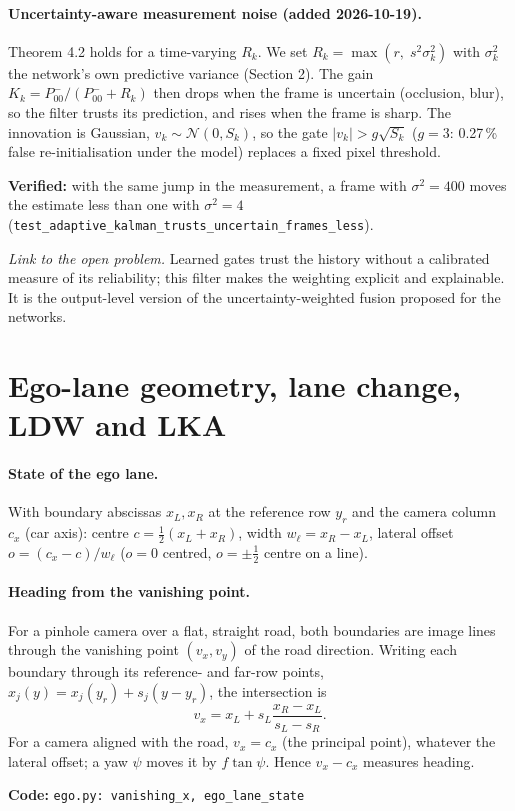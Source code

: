 \documentclass[10pt,a4paper]{article}
\newcommand{\code}[1]{\texttt{\small #1}}
\newcommand{\impl}[1]{\par\noindent\textcolor{blue!50!black}{\small\textbf{Code:} \texttt{#1}}\par}
\newcommand{\verif}[1]{\par\noindent\textcolor{green!35!black}{\small\textbf{Verified:} #1}\par}
\theoremstyle{definition}
\begin{document}
\paragraph{Uncertainty-aware measurement noise (added 2026-10-19).} Theorem 4.2 holds for a time-varying $R_k$.
We set $R_k=\max(r,\;s^2\sigma^2_k)$ with $\sigma^2_k$ the network's own predictive variance (Section 2). The gain
$K_k=P^-_{00}/(P^-_{00}+R_k)$ then drops when the frame is uncertain (occlusion, blur), so the filter trusts its
prediction, and rises when the frame is sharp. The innovation is Gaussian, $v_k\sim\mathcal N(0,S_k)$, so the gate
$|v_k|>g\sqrt{S_k}$ ($g=3$: 0.27\,\% false re-initialisation under the model) replaces a fixed pixel threshold.
\verif{with the same jump in the measurement, a frame with $\sigma^2=400$ moves the estimate less than one with
$\sigma^2=4$ (\code{test\_adaptive\_kalman\_trusts\_uncertain\_frames\_less}).}
\emph{Link to the open problem.} Learned gates trust the history without a calibrated measure of its reliability;
this filter makes the weighting explicit and explainable. It is the output-level version of the
uncertainty-weighted fusion proposed for the networks.

\section{Ego-lane geometry, lane change, LDW and LKA}
\paragraph{State of the ego lane.} With boundary abscissas $x_L,x_R$ at the reference row $y_r$ and the camera
column $c_x$ (car axis): centre $c=\tfrac12(x_L+x_R)$, width $w_\ell=x_R-x_L$, lateral offset
$o=(c_x-c)/w_\ell$ ($o=0$ centred, $o=\pm\tfrac12$ centre on a line).

\paragraph{Heading from the vanishing point.} For a pinhole camera over a flat, straight road, both boundaries are
image lines through the vanishing point $(v_x,v_y)$ of the road direction. Writing each boundary through its
reference- and far-row points, $x_j(y)=x_j(y_r)+s_j(y-y_r)$, the intersection is
\begin{equation}
v_x=x_L+s_L\frac{x_R-x_L}{s_L-s_R}.
\end{equation}
For a camera aligned with the road, $v_x=c_x$ (the principal point), whatever the lateral offset; a yaw $\psi$
moves it by $f\tan\psi$. Hence $v_x-c_x$ measures heading. \impl{ego.py: vanishing\_x, ego\_lane\_state}
\end{document}
